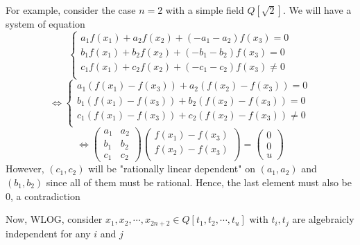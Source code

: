 \documentclass[english, 10pt]{article} %
\begin{document}
For example, consider the case $n=2$ with a simple field $Q[\sqrt{2}]$. We will have a system of equation
$$\begin{cases}
a_1f(x_1)+a_2f(x_2)+(-a_1-a_2)f(x_3)=0\\
b_1f(x_1)+b_2f(x_2)+(-b_1-b_2)f(x_3)=0\\
c_1f(x_1)+c_2f(x_2)+(-c_1-c_2)f(x_3)\neq 0\\
\end{cases}$$
$$\iff
\begin{cases}
a_1(f(x_1)-f(x_3))+a_2(f(x_2)-f(x_3))=0\\
b_1(f(x_1)-f(x_3))+b_2(f(x_2)-f(x_3))=0\\
c_1(f(x_1)-f(x_3))+c_2(f(x_2)-f(x_3)) \neq 0\\
\end{cases}$$
$$\iff \begin{pmatrix}
a_1 & a_2\\
b_1 & b_2\\
c_1 & c_2
\end{pmatrix} \begin{pmatrix}
f(x_1)-f(x_3)\\
f(x_2)-f(x_3)\\
\end{pmatrix}=\begin{pmatrix}
0\\
0\\
u
\end{pmatrix}$$
However, $(c_1,c_2)$ will be "rationally linear dependent" on $(a_1,a_2)$ and $(b_1,b_2)$ since all of them must be rational. Hence, the last element must also be $0$, a contradiction

Now, WLOG, consider $x_1,x_2,\cdots,x_{2n+2} \in Q[t_1,t_2,\cdots,t_u]$ with $t_i,t_j$ are algebraicly independent for any $i$ and $j$
\end{document}
